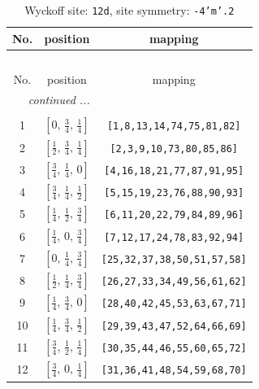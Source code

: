 \documentclass[fleqn,8pt]{jsarticle}
\begin{document}
\begin{longtable}{ccc}
\caption{Wyckoff site: {\tt 12d}, site symmetry: {\tt -4'm'.2}}
 \\
 \hline \hline
No. & position & mapping \\ \hline \endfirsthead

\multicolumn{2}{l}{\tablename\ \thetable{}} \\
 \hline \hline
No. & position & mapping \\ \hline \endhead

 \hline \hline
\multicolumn{2}{r}{\footnotesize\it continued ...} \\ \endfoot

 \hline \hline
\multicolumn{2}{r}{} \\ \endlastfoot

1 & $\left[ 0,\, \frac{3}{4},\, \frac{1}{4} \right]$ & {\tt [1,8,13,14,74,75,81,82]} \\ \hline
2 & $\left[ \frac{1}{2},\, \frac{3}{4},\, \frac{1}{4} \right]$ & {\tt [2,3,9,10,73,80,85,86]} \\ \hline
3 & $\left[ \frac{3}{4},\, \frac{1}{4},\, 0 \right]$ & {\tt [4,16,18,21,77,87,91,95]} \\ \hline
4 & $\left[ \frac{3}{4},\, \frac{1}{4},\, \frac{1}{2} \right]$ & {\tt [5,15,19,23,76,88,90,93]} \\ \hline
5 & $\left[ \frac{1}{4},\, \frac{1}{2},\, \frac{3}{4} \right]$ & {\tt [6,11,20,22,79,84,89,96]} \\ \hline
6 & $\left[ \frac{1}{4},\, 0,\, \frac{3}{4} \right]$ & {\tt [7,12,17,24,78,83,92,94]} \\ \hline
7 & $\left[ 0,\, \frac{1}{4},\, \frac{3}{4} \right]$ & {\tt [25,32,37,38,50,51,57,58]} \\ \hline
8 & $\left[ \frac{1}{2},\, \frac{1}{4},\, \frac{3}{4} \right]$ & {\tt [26,27,33,34,49,56,61,62]} \\ \hline
9 & $\left[ \frac{1}{4},\, \frac{3}{4},\, 0 \right]$ & {\tt [28,40,42,45,53,63,67,71]} \\ \hline
10 & $\left[ \frac{1}{4},\, \frac{3}{4},\, \frac{1}{2} \right]$ & {\tt [29,39,43,47,52,64,66,69]} \\ \hline
11 & $\left[ \frac{3}{4},\, \frac{1}{2},\, \frac{1}{4} \right]$ & {\tt [30,35,44,46,55,60,65,72]} \\ \hline
12 & $\left[ \frac{3}{4},\, 0,\, \frac{1}{4} \right]$ & {\tt [31,36,41,48,54,59,68,70]} \\
\end{longtable}
\renewcommand{\arraystretch}{1.2}
\end{document}
